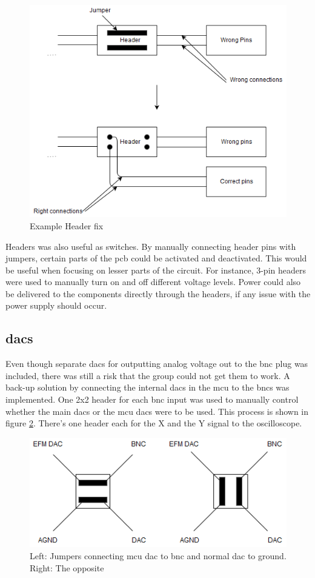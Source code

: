 \begin{figure}[h!]
\centering
\includegraphics[scale = 0.45]{images/Header_fix.png}
\caption{Example Header fix}
\label{fig:Header fix}
\end{figure}

Headers was also useful as switches. 
By manually connecting header pins with jumpers, certain parts of the \gls{pcb} could be activated and deactivated. 
This would be useful when focusing on lesser parts of the circuit. 
For instance, 3-pin headers were used to manually turn on and off different voltage levels. 
Power could also be delivered to the components directly through the headers, if any issue with the power supply should occur.

\subsection{\gls{dac}s}
Even though separate \gls{dac}s for outputting analog voltage out to the \gls{bnc} plug was included, there was still a risk that the group could not get them to work. 
A back-up solution by connecting the internal \gls{dac}s in the \gls{mcu} to the \gls{bnc}s was implemented. 
One 2x2 header for each \gls{bnc} input was used to manually control whether the main \gls{dac}s or the \gls{mcu} \gls{dac}s were to be used. 
This process is shown in figure \ref{fig:DAC headers}. 
There's one header each for the X and the Y signal to the oscilloscope. 

\begin{figure}[h!]
\centering
\includegraphics[scale = 0.6]{images/DAC_headers.png}
\caption{Left: Jumpers connecting \gls{mcu} \gls{dac} to \gls{bnc} and normal \gls{dac} to ground. Right: The opposite}
\label{fig:DAC headers}
\end{figure}

